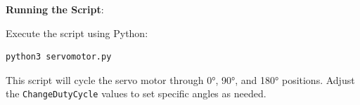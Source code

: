 \documentclass{article}
\begin{document}
	\textbf{Running the Script}:
	
	Execute the script using Python:
	\begin{lstlisting}[language=bash]
		python3 servomotor.py
	\end{lstlisting}
	
	This script will cycle the servo motor through 0°, 90°, and 180° positions. Adjust the \texttt{ChangeDutyCycle} values to set specific angles as needed.
	
\end{document}
